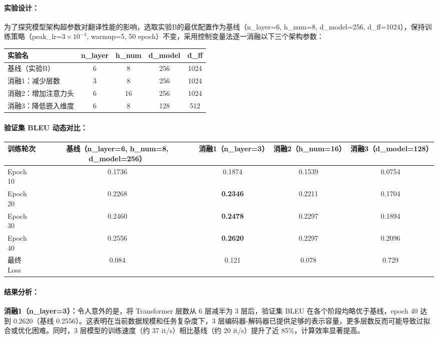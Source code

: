 \documentclass[11pt,a4paper]{article}
\begin{document}
\paragraph{实验设计：}
为了探究模型架构超参数对翻译性能的影响，选取实验B的最优配置作为基线（n\_layer=6, h\_num=8, d\_model=256, d\_ff=1024），保持训练策略（peak\_lr=$3\times 10^{-4}$, warmup=5, 50 epoch）不变，采用控制变量法逐一消融以下三个架构参数：

\begin{table}[h]
\centering
\begin{tabular}{lcccc}
\toprule
实验名 & n\_layer & h\_num & d\_model & d\_ff \\
\midrule
基线（实验B） & 6 & 8 & 256 & 1024 \\
消融1：减少层数 & 3 & 8 & 256 & 1024 \\
消融2：增加注意力头 & 6 & 16 & 256 & 1024 \\
消融3：降低嵌入维度 & 6 & 8 & 128 & 512 \\
\bottomrule
\end{tabular}
\end{table}

\paragraph{验证集 BLEU 动态对比：}

\begin{table}[h]
\centering
\begin{tabular}{lcccc}
\toprule
训练轮次 & 基线（n\_layer=6, h\_num=8, d\_model=256） & 消融1（n\_layer=3） & 消融2（h\_num=16） & 消融3（d\_model=128） \\
\midrule
Epoch 10 & 0.1736 & 0.1874 & 0.1539 & 0.0754 \\
Epoch 20 & 0.2268 & \textbf{0.2346} & 0.2211 & 0.1704 \\
Epoch 30 & 0.2460 & \textbf{0.2478} & 0.2297 & 0.1894 \\
Epoch 40 & 0.2556 & \textbf{0.2620} & 0.2297 & 0.2096 \\
最终 Loss & 0.084 & 0.121 & 0.078 & 0.729 \\
\bottomrule
\end{tabular}
\end{table}

\paragraph{结果分析：}

\textbf{消融1（n\_layer=3）：}令人意外的是，将 Transformer 层数从 6 层减半为 3 层后，验证集 BLEU 在各个阶段均略优于基线，epoch 40 达到 0.2620（基线 0.2556）。这表明在当前数据规模和任务复杂度下，3 层编码器-解码器已提供足够的表示容量，更多层数反而可能导致过拟合或优化困难。同时，3 层模型的训练速度（约 37 it/s）相比基线（约 20 it/s）提升了近 85\%，计算效率显著提高。
\end{document}
